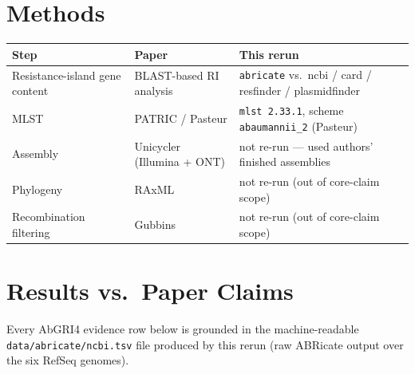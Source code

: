 \documentclass[11pt]{article}
\begin{document}
\section{Methods}

\begin{center}
\begin{tabular}{@{}lll@{}}
\toprule
\textbf{Step} & \textbf{Paper} & \textbf{This rerun} \\
\midrule
Resistance-island gene content & BLAST-based RI analysis        & \texttt{abricate} vs.\ ncbi / card / resfinder / plasmidfinder \\
MLST                          & PATRIC / Pasteur              & \texttt{mlst 2.33.1}, scheme \texttt{abaumannii\_2} (Pasteur) \\
Assembly                      & Unicycler (Illumina + ONT)    & not re-run --- used authors' finished assemblies \\
Phylogeny                     & RAxML                          & not re-run (out of core-claim scope) \\
Recombination filtering       & Gubbins                        & not re-run (out of core-claim scope) \\
\bottomrule
\end{tabular}
\end{center}

\section{Results vs.\ Paper Claims}

Every AbGRI4 evidence row below is grounded in the machine-readable \texttt{data/abricate/ncbi.tsv} file
produced by this rerun (raw ABRicate output over the six RefSeq genomes).
\end{document}
